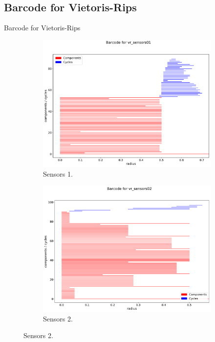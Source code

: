 \documentclass{beamer}
\begin{document}
\subsection{Barcode for Vietoris-Rips}

\begin{frame}{Barcode for Vietoris-Rips}

\begin{figure}[!ht]
	\centering
	\begin{subfigure}{.5\textwidth}
		\centering
		\includegraphics[scale=0.19]{used_images/barcode_vr_sensors01.pdf}
		\caption{Sensors 1.}
	\end{subfigure}%
	\begin{subfigure}{.5\textwidth}
		\centering
		\includegraphics[scale=0.19]{used_images/barcode_vr_sensors02.pdf}
		\caption{Sensors 2.}
	\end{subfigure}%
	
\end{figure}
\end{frame}
\end{document}

